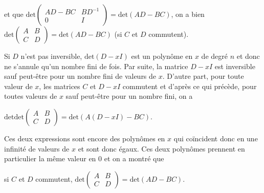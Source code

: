 {{et que $\text{det}\left(
\begin{array}{cc}
AD-BC&BD^{-1}\\
0&I
\end{array}
\right)=\text{det}(AD-BC)$, on a bien $\text{det}\left(
\begin{array}{cc}
A&B\\
C&D
\end{array}
\right)=\text{det}(AD-BC)$ (si $C$ et $D$ commutent).

Si $D$ n'est pas inversible, $\text{det}(D-xI)$ est un polynôme en $x$ de degré $n$ et donc ne s'annule qu'un nombre fini de fois. Par suite, la matrice $D-xI$ est inversible sauf peut-être pour un nombre fini de valeurs de $x$. D'autre part, pour toute valeur de $x$, les matrices $C$ et $D-xI$ commutent et d'après ce qui précède, pour toutes valeurs de $x$ sauf peut-être pour un nombre fini, on a

\begin{center}
$\text{det}\text{det}\left(
\begin{array}{cc}
A&B\\
C&D
\end{array}
\right)=\text{det}(A(D-xI)-BC)$.
\end{center}

Ces deux expressions sont encore des polynômes en $x$ qui coïncident donc en une infinité de valeurs de $x$ et sont donc égaux. Ces deux polynômes prennent en particulier la même valeur en $0$ et on a montré que

\begin{center}
si $C$ et $D$ commutent, $\text{det}\left(
\begin{array}{cc}
A&B\\
C&D
\end{array}
\right)=\text{det}(AD-BC)$.
\end{center}
}
}
